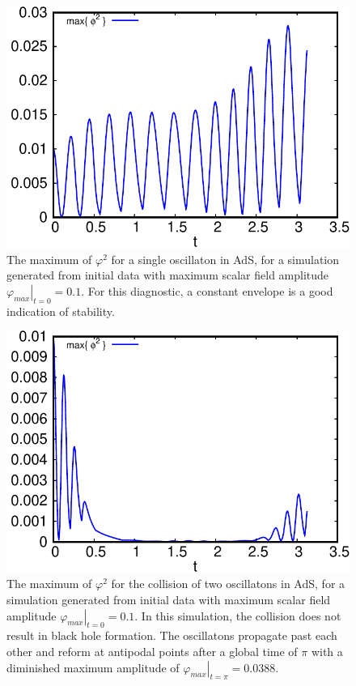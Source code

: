 \documentclass[prl,twocolumn,superscriptaddress]{revtex4-1}
\begin{document}
\begin{figure}[t]
  \includegraphics[width=\linewidth]{diagnostic-single.pdf}
                        {\caption{
                            The maximum of $\varphi^2$ for a single oscillaton in AdS, for a simulation generated from initial data with maximum scalar field amplitude $\left. \varphi_{max} \right|_{t=0}=0.1$. 
For this diagnostic, a constant envelope is a good indication of stability.
                        }\label{fig:diagnostic-single}}
\end{figure}

\begin{figure}[t]
  \includegraphics[width=\linewidth]{diagnostic-collision.pdf}
                        {\caption{
                            The maximum of $\varphi^2$ for the collision of two oscillatons in AdS, for a simulation generated from initial data with maximum scalar field amplitude $\left. \varphi_{max} \right|_{t=0}=0.1$. In this simulation, the collision does not result in black hole formation. The oscillatons propagate past each other and reform at antipodal points after a global time of $\pi$ with a diminished maximum amplitude of $\left. \varphi_{max} \right|_{t=\pi}=0.0388$.
                        }\label{fig:diagnostic-single}}
\end{figure}
\end{document}
